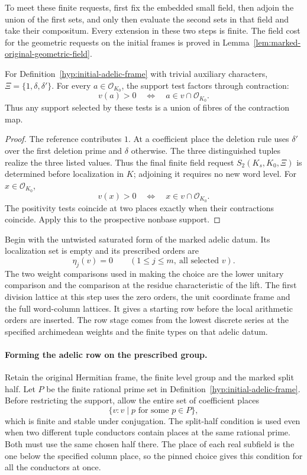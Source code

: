 To meet these finite requests, first fix the embedded small field, then adjoin the union of the first sets, and only then evaluate the second sets in that field and take their compositum. Every extension in these two steps is finite. The field cost for the geometric requests on the initial frames is proved in Lemma~\ref{lem:marked-original-geometric-field}.
\begin{lemma}
For Definition~\ref{hyp:initial-adelic-frame} with trivial auxiliary characters,
\(\Xi=\{1,\delta,\delta'\}\). For every \(a\in\mathcal O_{K_0}\), the support test factors through contraction:
\[
 v(a)>0\quad\Longleftrightarrow\quad a\in v\cap\mathcal O_{K_0}.
\]
Thus any support selected by these tests is a union of fibres of the contraction map.
\end{lemma}
\begin{proof}
The reference contributes \(1\). At a coefficient place the
deletion rule uses \(\delta'\) over the first deletion prime
and \(\delta\) otherwise. The three distinguished tuples realize
the three listed values. Thus the final finite field request
\(S_2(K_s,K_0,\Xi)\) is determined before localization in \(K\);
adjoining it requires no new word level. For \(x\in\mathcal O_{K_0}\),
\[
 v(x)>0\quad\Longleftrightarrow\quad x\in v\cap\mathcal O_{K_0}.
\]
The positivity tests coincide at two places exactly when their
contractions coincide. Apply this to the prospective nonbase support.
\end{proof}

Begin with the untwisted saturated form of the marked adelic datum.
Its localization set is empty and its prescribed orders are
\[
                 \eta_j(v)=0\qquad(1\le j\le m,\ \text{all selected }v).
\] The two
weight comparisons used in making the choice are the lower
unitary comparison and the comparison at the residue characteristic
of the lift. The first division lattice at this step uses the zero
orders, the unit coordinate frame and the full word-column lattices.
It gives a starting row before the local arithmetic orders are
inserted. The row stage comes from the lowest discrete series at
the specified archimedean weights and the finite types on that
adelic datum. \label{cor:automorphic-realization-1}

\paragraph{Forming the adelic row on the prescribed group.}
Retain the original Hermitian frame, the finite level group and
the marked split half. Let \(P\) be the finite rational prime set in
Definition~\ref{hyp:initial-adelic-frame}. Before restricting the
support, allow the entire set of coefficient places
\[
             \{v:v\mid p\text{ for some }p\in P\},
\]
which is finite and stable under conjugation. The split-half condition is used even
when two different tuple conductors contain places at the same
rational prime. Both must use the same chosen half there. The
place of each real subfield is the one below the specified
column place, so the pinned choice gives this condition for
all the conductors at once.

